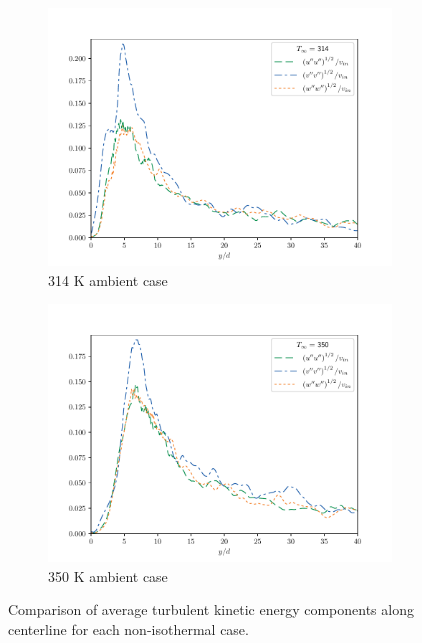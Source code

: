 \begin{figure}[H]
\begin{center}
\begin{subfigure}{0.45\textwidth}
	\includegraphics[scale=.45]{figures/Plots/centerline/314_TKEuvw_centerline.pdf}
	\caption{314 K ambient case} \label{314_TKEcomp_1}
\end{subfigure}
\begin{subfigure}{0.45\textwidth}
	\includegraphics[scale=.45]{figures/Plots/centerline/350_TKEuvw_centerline.pdf}
	\caption{350 K ambient case} \label{350_TKEcomp_1}
\end{subfigure}
\caption{Comparison of average turbulent kinetic energy components along centerline for each non-isothermal case.}
\label{noniso_TKE_component_features}
\end{center}
\end{figure}

